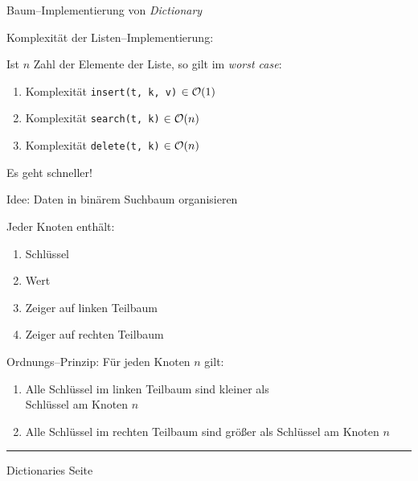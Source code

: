 \begin{slide}{}
\normalsize

\begin{center}
Baum--Implementierung von \textsl{Dictionary}
\end{center}
\vspace*{0.5cm}

\footnotesize
Komplexit\"at der Listen--Implementierung: 

Ist $n$ Zahl der Elemente der Liste, so gilt im \emph{worst case}:
\begin{enumerate}
\item Komplexit\"at \texttt{insert(t, k, v)} $\in \mathcal{O}(1)$
\item Komplexit\"at \texttt{search(t, k)} $\in \mathcal{O}(n)$
\item Komplexit\"at \texttt{delete(t, k)} $\in \mathcal{O}(n)$
\end{enumerate}
Es geht schneller!

Idee: Daten in bin\"arem Suchbaum organisieren

Jeder Knoten enth\"alt:
\begin{enumerate}
\item Schl\"ussel
\item Wert
\item Zeiger auf linken Teilbaum
\item Zeiger auf rechten Teilbaum
\end{enumerate}

Ordnungs--Prinzip: F\"ur jeden Knoten $n$ gilt:
\begin{enumerate}
\item Alle Schl\"ussel im linken Teilbaum sind kleiner als \\
      Schl\"ussel am Knoten $n$
\item Alle Schl\"ussel im rechten Teilbaum sind gr\"o{\ss}er als
      Schl\"ussel am Knoten $n$
\end{enumerate}


\vspace*{\fill}
\tiny \addtocounter{mypage}{1}
\rule{17cm}{1mm}
Dictionaries  \hspace*{\fill} Seite 
\end{slide}


